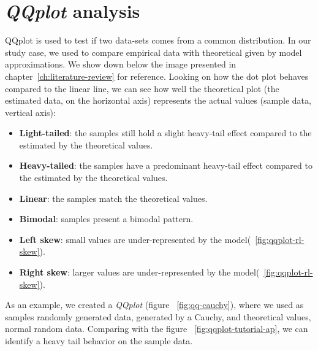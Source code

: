\section{\textit{QQplot} analysis}

QQplot is used to test if two data-sets comes from a common distribution\cite{web-qqplot}. In our study case, we used to compare empirical data with theoretical given by model approximations. We show down below the image presented in chapter~\ref{ch:literature-review} for reference. 
Looking on how the dot plot behaves compared to the linear line, we can see how well the theoretical plot (the estimated data, on the horizontal axis) represents the actual values (sample data, vertical axis):

\begin{itemize}
\item \textbf{Light-tailed}: the samples still hold a slight heavy-tail effect compared to the estimated by the theoretical values.
\item \textbf{Heavy-tailed}: the samples have a predominant heavy-tail effect compared to the estimated by the theoretical values.
\item \textbf{Linear}: the samples match the theoretical values.
\item \textbf{Bimodal}: samples present a bimodal pattern.
\item \textbf{Left skew}: small values are under-represented by the model(~\ref{fig:qqplot-rl-skew}).
\item \textbf{Right skew}: larger values are under-represented by the model(~\ref{fig:qqplot-rl-skew}).
\end{itemize}



As an example, we created a \textit{QQplot} (figure ~\ref{fig:qq-cauchy}), where we used as samples randomly generated data, generated by a Cauchy, and theoretical values, normal random data. Comparing with the figure ~\ref{fig:qqplot-tutorial-ap}, we can identify a heavy tail behavior on the sample data.



